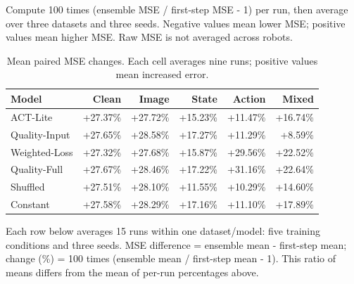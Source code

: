 \documentclass[11pt,a4paper]{article}
\renewcommand{\arraystretch}{1.18}
\begin{document}
\begingroup\small\renewcommand{\arraystretch}{1.08}\setlength{\intextsep}{8pt}
Compute 100 times (ensemble MSE / first-step MSE - 1) per run, then average over three datasets and three seeds. Negative values mean lower MSE; positive values mean higher MSE. Raw MSE is not averaged across robots.
\begin{table}[H]\centering\small\begin{tabularx}{\linewidth}{Yrrrrr}\toprule
Model & Clean & Image & State & Action & Mixed\\\midrule
ACT-Lite & +27.37\% & +27.72\% & +15.23\% & +11.47\% & +16.74\%\\
Quality-Input & +27.65\% & +28.58\% & +17.27\% & +11.29\% & +8.59\%\\
Weighted-Loss & +27.32\% & +27.68\% & +15.87\% & +29.56\% & +22.52\%\\
Quality-Full & +27.67\% & +28.46\% & +17.22\% & +31.16\% & +22.64\%\\
Shuffled & +27.51\% & +28.10\% & +11.55\% & +10.29\% & +14.60\%\\
Constant & +27.58\% & +28.29\% & +17.16\% & +11.10\% & +17.89\%\\
\bottomrule\end{tabularx}\caption{Mean paired MSE changes. Each cell averages nine runs; positive values mean increased error.}\end{table}
Each row below averages 15 runs within one dataset/model: five training conditions and three seeds. MSE difference = ensemble mean - first-step mean; change (\%) = 100 times (ensemble mean / first-step mean - 1). This ratio of means differs from the mean of per-run percentages above.
\end{document}
